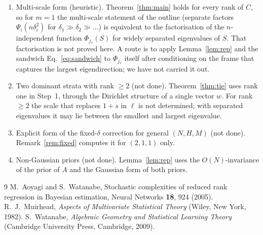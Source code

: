 \documentclass[11pt]{article}
\theoremstyle{remark}
\begin{document}
\begin{enumerate}
\item Multi-scale form (heuristic). Theorem~\ref{thm:main} holds for every rank of $C$, so for $m=1$ the multi-scale statement of the outline (separate factors $\Psi_i(n\delta_i^2)$ for $\delta_1\gg\delta_2\gg\dots$) is equivalent to the factorisation of the $n$-independent function $\Phi_{j_*}(S)$ for widely separated eigenvalues of $S$. That factorisation is not proved here. A route is to apply Lemma~\ref{lem:rep} and the sandwich Eq.~\eqref{eq:sandwich} to $\Phi_{j_*}$ itself after conditioning on the frame that captures the largest eigendirection; we have not carried it out.
\item Two dominant strata with rank $\ge2$ (not done). Theorem~\ref{thm:tie} uses rank one in Step~1, through the Dirichlet structure of a single vector $w$. For rank $\ge2$ the scale that replaces $1+s$ in $\ell$ is not determined; with separated eigenvalues it may lie between the smallest and largest eigenvalue.
\item Explicit form of the fixed-$\delta$ correction for general $(N,H,M)$ (not done). Remark~\ref{rem:fixed} computes it for $(2,1,1)$ only.
\item Non-Gaussian priors (not done). Lemma~\ref{lem:rep} uses the $O(N)$-invariance of the prior of $A$ and the Gaussian form of both priors.
\end{enumerate}

\begin{thebibliography}{9}
 M.~Aoyagi and S.~Watanabe, Stochastic complexities of reduced rank regression in Bayesian estimation, Neural Networks \textbf{18}, 924 (2005).
 R.~J.~Muirhead, \emph{Aspects of Multivariate Statistical Theory} (Wiley, New York, 1982).
 S.~Watanabe, \emph{Algebraic Geometry and Statistical Learning Theory} (Cambridge University Press, Cambridge, 2009).
\end{thebibliography}
\end{document}

